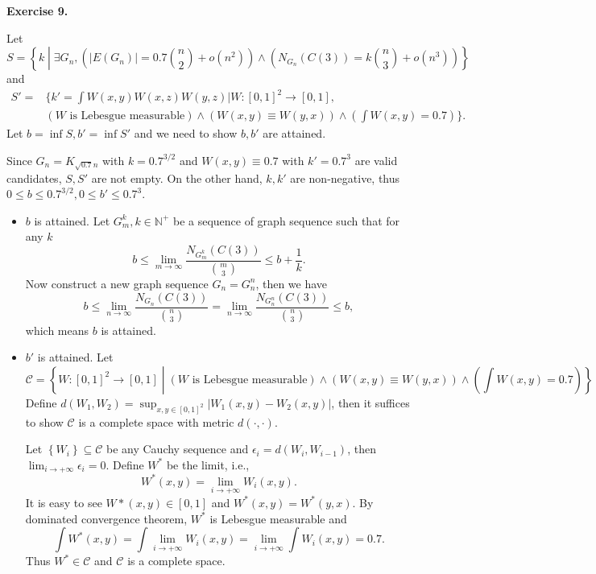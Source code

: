 \documentclass[a4paper]{article}
\newenvironment{exercise}[1]{
	\par
	\noindent\textbf{Exercise #1.}\quad
}{
	\par
	\bigskip
}
\newcommand{\abs}[1]{\left| #1 \right|}
\newcommand{\pbra}[1]{\left( #1 \right)}
\newcommand{\cbra}[1]{\left\{ #1 \right\}}
\newcommand{\Nbb}{\mathbb{N}}
\newcommand{\Ccal}{\mathcal{C}}
\begin{document}
\begin{exercise}{9}
    Let 
    $$
    S=\cbra{k\middle|\exists G_n,\pbra{|E(G_n)|=0.7\binom n2+o(n^2)}\land\pbra{N_{G_n}(C(3))=k\binom n3+o(n^3)}}
    $$
    and
    \begin{align*}
        S'=&\bigg\{k'=\int W(x,y)W(x,z)W(y,z)\bigg|W:[0,1]^2\to[0,1],\\
        &\pbra{W\text{ is Lebesgue measurable}}
        \land\pbra{W(x,y)\equiv W(y,x)}\land\pbra{\int W(x,y)=0.7}\bigg\}.
    \end{align*}
    Let $b=\inf S,b'=\inf S'$ and we need to show $b,b'$ are attained.

    Since $G_n=K_{\sqrt{0.7}n}$ with $k=0.7^{3/2}$ and $W(x,y)\equiv0.7$ with $k'=0.7^3$ are valid candidates, 
    $S,S'$ are not empty.
    On the other hand, $k,k'$ are non-negative, thus $0\leq b\leq0.7^{3/2},0\leq b'\leq0.7^3$.

    \begin{itemize}
        \item $b$ is attained. Let $G_m^k,k\in\Nbb^+$ be a sequence of graph sequence such that for any $k$
            $$
            b\leq\lim_{m\to\infty}\frac{N_{G_m^k}(C(3))}{\binom m3}\leq b+\frac1k.
            $$
            Now construct a new graph sequence $G_n=G_n^n$, then we have
            $$
            b\leq\lim_{n\to\infty}\frac{N_{G_n}(C(3))}{\binom n3}=
            \lim_{n\to\infty}\frac{N_{G_n^n}(C(3))}{\binom n3}\leq b,
            $$
            which means $b$ is attained.
        \item $b'$ is attained. Let 
            $$
            \Ccal=\cbra{W:[0,1]^2\to[0,1]\middle|
            \pbra{W\text{ is Lebesgue measurable}}
            \land\pbra{W(x,y)\equiv W(y,x)}\land\pbra{\int W(x,y)=0.7}}.
            $$
            Define $d(W_1,W_2)=\sup_{x,y\in[0,1]^2}\abs{W_1(x,y)-W_2(x,y)}$, then it suffices to show $\Ccal$ is a complete
            space with metric $d(\cdot,\cdot)$.

            Let $\cbra{W_i}\subseteq\Ccal$ be any Cauchy sequence and $\epsilon_i=d(W_i,W_{i-1})$, 
            then $\lim_{i\to+\infty}\epsilon_i=0$. Define $W^*$ be the limit, i.e.,
            $$
            W^*(x,y)=\lim_{i\to+\infty}W_i(x,y).
            $$
            It is easy to see $W*(x,y)\in[0,1]$ and $W^*(x,y)=W^*(y,x)$. By dominated convergence theorem, $W^*$ is Lebesgue
            measurable and 
            $$
            \int W^*(x,y)=\int\lim_{i\to+\infty}W_i(x,y)=\lim_{i\to+\infty}\int W_i(x,y)=0.7.
            $$
            Thus $W^*\in\Ccal$ and $\Ccal$ is a complete space.
    \end{itemize}
\end{exercise}
\end{document}

